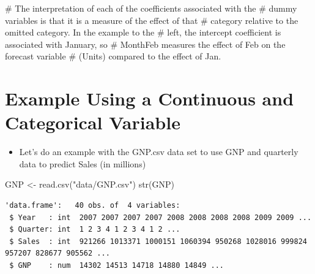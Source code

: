\documentclass[
  letterpaper,
  DIV=11,
  numbers=noendperiod]{scrreprt}
\newenvironment{Shaded}{\begin{snugshade}}{\end{snugshade}}
\newcommand{\AttributeTok}[1]{\textcolor[rgb]{0.40,0.45,0.13}{#1}}
\newcommand{\CommentTok}[1]{\textcolor[rgb]{0.37,0.37,0.37}{#1}}
\newcommand{\FunctionTok}[1]{\textcolor[rgb]{0.28,0.35,0.67}{#1}}
\newcommand{\NormalTok}[1]{\textcolor[rgb]{0.00,0.23,0.31}{#1}}
\newcommand{\OtherTok}[1]{\textcolor[rgb]{0.00,0.23,0.31}{#1}}
\newcommand{\SpecialCharTok}[1]{\textcolor[rgb]{0.37,0.37,0.37}{#1}}
\newcommand{\StringTok}[1]{\textcolor[rgb]{0.13,0.47,0.30}{#1}}
\providecommand{\tightlist}{%
  \setlength{\itemsep}{0pt}\setlength{\parskip}{0pt}}\usepackage{longtable,booktabs,array}
\begin{document}
\begin{Shaded}
\begin{Highlighting}[]
\CommentTok{\# The interpretation of each of the coefficients associated with the}
\CommentTok{\# dummy variables is that it is a measure of the effect of that}
\CommentTok{\# category relative to the omitted category. In the example to the}
\CommentTok{\# left, the intercept coefficient is associated with January, so}
\CommentTok{\# MonthFeb measures the effect of Feb on the forecast variable}
\CommentTok{\# (Units) compared to the effect of Jan.}
\end{Highlighting}
\end{Shaded}

\section{Example Using a Continuous and Categorical
Variable}\label{example-using-a-continuous-and-categorical-variable}

\begin{itemize}
\tightlist
\item
  Let's do an example with the GNP.csv data set to use GNP and quarterly
  data to predict Sales (in millions)
\end{itemize}

\begin{Shaded}
\begin{Highlighting}[]
\NormalTok{GNP }\OtherTok{\textless{}{-}} \FunctionTok{read.csv}\NormalTok{(}\StringTok{"data/GNP.csv"}\NormalTok{)}
\FunctionTok{str}\NormalTok{(GNP)}
\end{Highlighting}
\end{Shaded}

\begin{verbatim}
'data.frame':   40 obs. of  4 variables:
 $ Year   : int  2007 2007 2007 2007 2008 2008 2008 2008 2009 2009 ...
 $ Quarter: int  1 2 3 4 1 2 3 4 1 2 ...
 $ Sales  : int  921266 1013371 1000151 1060394 950268 1028016 999824 957207 828677 905562 ...
 $ GNP    : num  14302 14513 14718 14880 14849 ...
\end{verbatim}

\begin{Shaded}
\end{Shaded}
\end{document}
